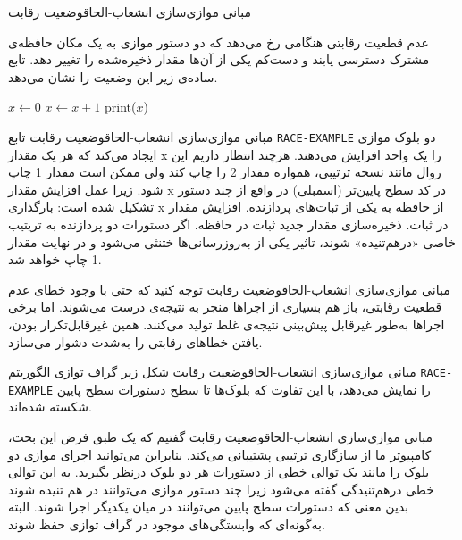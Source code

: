 \begin{itemframe-s}{مبانی موازی‌سازی انشعاب-الحاق}{وضعیت رقابت}
\itm

عدم قطعیت رقابتی هنگامی رخ می‌دهد که دو دستور موازی به یک مکان حافظه‌ی مشترک دسترسی یابند و دست‌کم یکی از آن‌ها مقدار ذخیره‌شده را تغییر دهد. تابع ساده‌ی زیر این وضعیت را نشان می‌دهد.
\begin{algorithm}[H]\alglr
\caption{RACE-EXAMPLE}
\begin{algorithmic}[1]
\State $x \gets 0$
    \State $x \gets x + 1$ 
\EndpFor
\State print($x$)
\end{algorithmic}
\end{algorithm}
\end{itemframe-s}


\begin{itemframe-s}{مبانی موازی‌سازی انشعاب-الحاق}{وضعیت رقابت}
\itm
تابع
\texttt{RACE-EXAMPLE}
دو بلوک موازی ایجاد می‌کند که هر یک مقدار x را یک واحد افزایش می‌دهند.
هرچند انتظار داریم این روال مانند نسخه ترتیبی، همواره مقدار 2 را چاپ کند ولی ممکن است مقدار 1 چاپ شود.
زیرا عمل افزایش مقدار x در کد سطح پایین‌تر (اسمبلی) در واقع از چند دستور تشکیل شده است:
\itm[1]
بارگذاری x
از حافظه به یکی از ثبات‌های پردازنده.
\itm[2]
افزایش مقدار در ثبات.
\itm[3]
ذخیره‌سازی مقدار جدید ثبات در حافظه.
\itm
اگر دستورات دو پردازنده به تریتیب خاصی «درهم‌تنیده»
شوند، تاثیر یکی از به‌روزرسانی‌ها ختنثی می‌شود و در نهایت مقدار 1 چاپ خواهد شد.
\end{itemframe-s}


\begin{itemframe-s}{مبانی موازی‌سازی انشعاب-الحاق}{وضعیت رقابت}
\itm
توجه کنید که حتی با وجود خطای عدم قطعیت رقابتی، باز هم  بسیاری از اجراها منجر به نتیجه‌ی درست می‌شوند.
اما برخی اجراها به‌طور غیرقابل پیش‌بینی نتیجه‌ی غلط تولید می‌کنند.
همین غیرقابل‌تکرار بودن، یافتن خطاهای رقابتی را به‌شدت دشوار می‌سازد.
\end{itemframe-s}


\begin{itemframe-s}{مبانی موازی‌سازی انشعاب-الحاق}{وضعیت رقابت}
\itm
شکل زیر گراف توازی الگوریتم
\texttt{RACE-EXAMPLE}
را نمایش می‌دهد، با این تفاوت که بلوک‌ها تا سطح دستورات سطح پایین شکسته شده‌اند.
\end{itemframe-s}


\begin{itemframe-s}{مبانی موازی‌سازی انشعاب-الحاق}{وضعیت رقابت}
\itm
گفتیم که یک طبق فرض این بحث، کامپیوتر ما از سازگاری ترتیبی
پشتیبانی می‌کند. بنابراین می‌توانید اجرای موازی دو بلوک را مانند یک توالی خطی از دستورات هر دو بلوک درنظر بگیرید.
\itm
به این توالی خطی درهم‌تنیدگی
گفته می‌شود زیرا چند دستور موازی می‌توانند در هم تنیده شوند بدین معنی که دستورات سطح پایین می‌توانند در میان یکدیگر اجرا شوند.
البته به‌گونه‌ای که وابستگی‌های موجود در گراف توازی حفظ شوند.

\end{itemframe-s}


